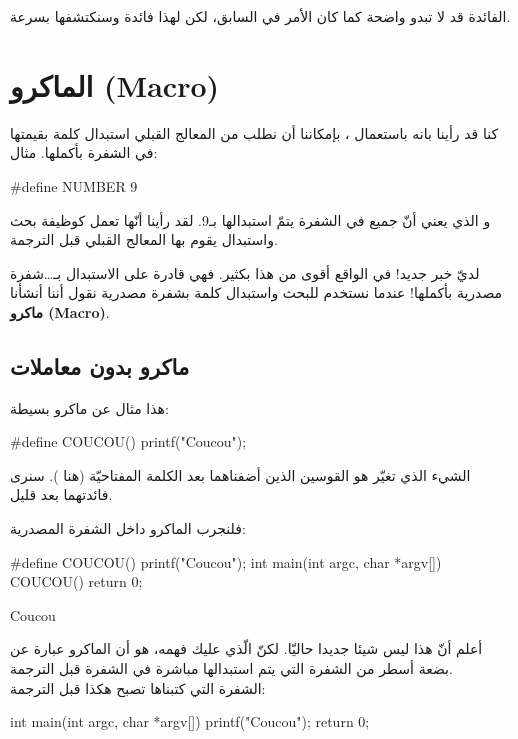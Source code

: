 الفائدة قد لا تبدو واضحة كما كان الأمر في السابق، لكن لهذا فائدة وسنكتشفها بسرعة.

\section{الماكرو (\textenglish{Macro})}

كنا قد رأينا بانه باستعمال ،
بإمكاننا أن نطلب من المعالج القبلي استبدال كلمة بقيمتها في الشفرة بأكملها. مثال:

\begin{Csource}
#define NUMBER 9
\end{Csource}

و الذي يعني أنّ جميع
في الشفرة يتمّ استبدالها بـ9. لقد رأينا أنّها تعمل كوظيفة بحث واستبدال يقوم بها المعالج القبلي قبل الترجمة.

لديّ خبر جديد! في الواقع
أقوى من هذا بكثير. فهي قادرة على الاستبدال بـ\dots شفرة مصدرية بأكملها! عندما نستخدم
للبحث واستبدال كلمة بشفرة مصدرية نقول أننا أنشأنا
\textbf{ماكرو
(\textenglish{Macro})}.

\subsection{ماكرو بدون معاملات}

هذا مثال عن ماكرو بسيطة:

\begin{Csource}
#define COUCOU() printf("Coucou");
\end{Csource}

الشيء الذي تغيّر هو القوسين الذين أضفناهما بعد الكلمة المفتاحيّة (هنا
).
سنرى فائدتهما بعد قليل.

فلنجرب الماكرو داخل الشفرة المصدرية:

\begin{Csource}
#define COUCOU() printf("Coucou");
int main(int argc, char *argv[])
{
  COUCOU()
  return 0;
}
\end{Csource}

\begin{Console}
Coucou
\end{Console}

أعلم أنّ هذا ليس شيئا جديدا حاليّا. لكنّ الّذي عليك فهمه، هو أن الماكرو عبارة عن بضعة أسطر من الشفرة التي يتم استبدالها مباشرة في الشفرة قبل الترجمة.\\
الشفرة التي كتبناها تصبح هكذا قبل الترجمة:

\begin{Csource}
int main(int argc, char *argv[])
{
	printf("Coucou");
	return 0;
}
\end{Csource}

